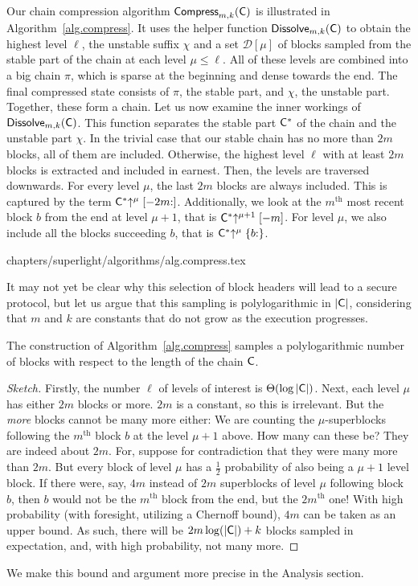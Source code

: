 Our chain compression algorithm
$\textsf{Compress}_{m,k}\allowbreak(\mathsf{C})$ is
illustrated in Algorithm~\ref{alg.compress}. It uses the helper function
$\textsf{Dissolve}_{m,k}(\mathsf{C})$ to obtain the highest level $\ell$, the unstable
suffix $\chi$ and a set $\mathcal{D}[\mu]$ of blocks sampled from the stable part of
the chain at each level $\mu \leq \ell$. All of these levels are combined into a big
chain $\pi$, which is sparse at the beginning and dense towards the end. The final
compressed state consists of $\pi$, the stable part, and $\chi$, the unstable part.
Together, these form a chain. Let us now examine the inner workings of
$\textsf{Dissolve}_{m,k}(\mathsf{C})$. This function separates the stable part $\mathsf{C}^*$
of the chain and the unstable part $\chi$. In the trivial case that our stable chain
has no more than $2m$ blocks, all of them are included. Otherwise, the highest level
$\ell$ with at least $2m$ blocks is extracted and included in earnest. Then, the
levels are traversed downwards. For every level $\mu$, the last $2m$ blocks are always
included. This is captured by the term $\mathsf{C}^*\negthickspace\uparrow^\mu[-2m{:}]$. Additionally,
we look at the $m^\text{th}$ most recent block $b$ from the end at level $\mu+1$, that is
$\mathsf{C}^*\negthickspace\uparrow^{\mu+1}[-m]$. For level $\mu$, we also include all the blocks succeeding
$b$, that is $\mathsf{C}^*\negthickspace\uparrow^\mu\{b{:}\}$.

{chapters/superlight/algorithms/alg.compress.tex}

It may not yet be clear why this selection of block headers will lead to a secure
protocol, but let us argue that this sampling is polylogarithmic in $|\mathsf{C}|$,
considering that $m$ and $k$ are constants that do not grow as the execution
progresses.

\begin{theorem}[Succinctness]
  The construction of Algorithm~\ref{alg.compress} samples a polylogarithmic
  number of blocks with respect to the length of the chain $\mathsf{C}$.
\end{theorem}
\begin{proof}[Sketch]
Firstly, the number $\ell$ of levels of interest is
$\Theta(\log|\mathsf{C}|)$. Next, each level $\mu$ has either $2m$ blocks or more.
$2m$ is a constant, so this is irrelevant. But the \emph{more} blocks cannot be
many more either: We are counting the $\mu$-superblocks following the
$m^\text{th}$ block $b$ at the level $\mu + 1$ above. How many can these be? They
are indeed about $2m$. For, suppose for contradiction that they were many more
than $2m$. But every block of level $\mu$ has a $\frac{1}{2}$ probability of
also being a $\mu+1$ level block. If there were, say, $4m$ instead of $2m$ superblocks
of level $\mu$ following block $b$, then $b$ would not be the $m^\text{th}$ block
from the end, but the $2m^\text{th}$ one! With high probability (with foresight,
utilizing a Chernoff bound), $4m$ can be taken
as an upper bound. As such, there will be $2m \log(|\mathsf{C}|) + k$
blocks sampled in expectation, and, with high probability, not many more.
\end{proof}

We make this bound and argument more precise in the Analysis
section.
